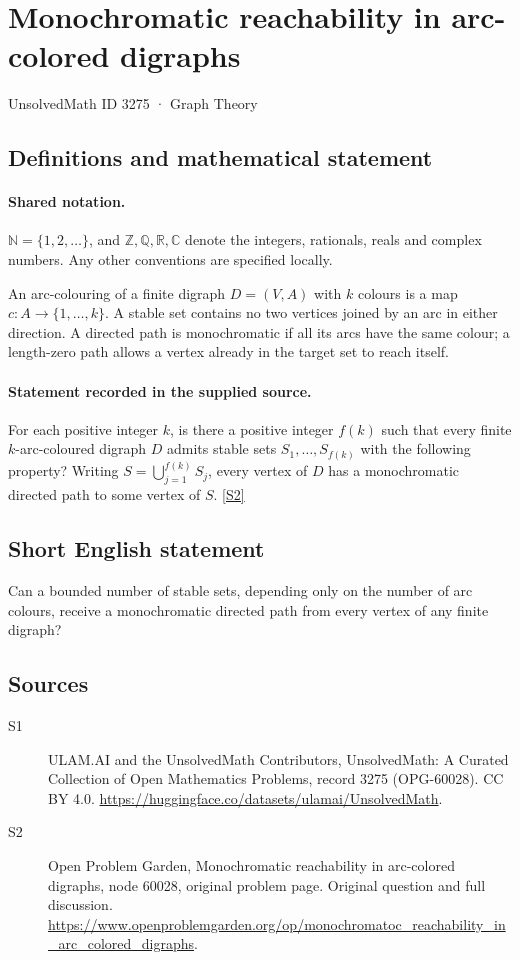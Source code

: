 \documentclass[11pt]{article}
\newcommand{\sref}[2]{\hyperlink{source:#1:#2}{[S#2]}}
\begin{document}
\setcounter{section}{3274}
\section{Monochromatic reachability in arc-colored digraphs}\label{3275}
{\small\sffamily UnsolvedMath ID 3275 · Graph Theory}
\subsection{Definitions and mathematical statement}

\paragraph{Shared notation.}$\mathbb N=\{1,2,\ldots\}$, and $\mathbb Z,\mathbb Q,\mathbb R,\mathbb C$ denote the integers, rationals, reals and complex numbers. Any other conventions are specified locally.


An arc-colouring of a finite digraph $D=(V,A)$ with $k$ colours is a map $c:A\to\{1,\ldots,k\}$. A stable set contains no two vertices joined by an arc in either direction. A directed path is monochromatic if all its arcs have the same colour; a length-zero path allows a vertex already in the target set to reach itself.
\paragraph{Statement recorded in the supplied source.}
For each positive integer $k$, is there a positive integer $f(k)$ such that every finite $k$-arc-coloured digraph $D$ admits stable sets $S_1,\ldots,S_{f(k)}$ with the following property? Writing $S=\bigcup_{j=1}^{f(k)}S_j$, every vertex of $D$ has a monochromatic directed path to some vertex of $S$. \sref{3275}{2}
\subsection{Short English statement}
Can a bounded number of stable sets, depending only on the number of arc colours, receive a monochromatic directed path from every vertex of any finite digraph?
\subsection{Sources}
\begin{description}
\item[\hypertarget{source:3275:1}{S1}] ULAM.AI and the UnsolvedMath Contributors, UnsolvedMath: A Curated Collection of Open Mathematics Problems, record 3275 (OPG-60028). CC BY 4.0. \url{https://huggingface.co/datasets/ulamai/UnsolvedMath}.
\item[\hypertarget{source:3275:2}{S2}] Open Problem Garden, Monochromatic reachability in arc-colored digraphs, node 60028, original problem page. Original question and full discussion. \url{https://www.openproblemgarden.org/op/monochromatoc_reachability_in_arc_colored_digraphs}.

\end{description}
\label{end:3275}
\end{document}
